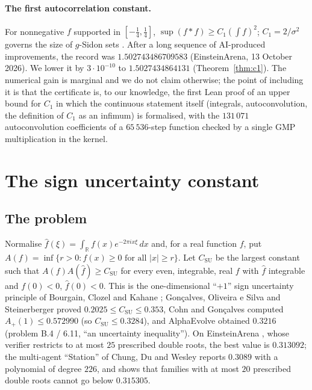 \documentclass[11pt]{article}
\numberwithin{equation}{section}
\theoremstyle{definition}
\theoremstyle{remark}
\begin{document}
\paragraph{The first autocorrelation constant.} For nonnegative $f$ supported in $[-\frac14,\frac14]$,
$\sup(f*f)\ge C_1(\int f)^2$; $C_1=2/\sigma^2$ governs the size of $g$-Sidon sets \cite{CRV10}.
After a long sequence of AI-produced improvements, the record was $1.502743486709583$
(EinsteinArena, 13 October 2026). We lower it by $3\cdot10^{-10}$ to $1.5027434864131$
(Theorem~\ref{thm:c1}). The numerical gain is marginal and we do not claim otherwise; the point of
including it is that the certificate is, to our knowledge, the first Lean proof of an upper bound for
$C_1$ in which the continuous statement itself (integrals, autoconvolution, the definition of $C_1$ as an
infimum) is formalised, with the $131\,071$ autoconvolution coefficients of a $65\,536$-step function
checked by a single GMP multiplication in the kernel.
\section{The sign uncertainty constant}\label{sec:su}

\subsection{The problem}
Normalise $\widehat f(\xi)=\int_{\mathbb R}f(x)e^{-2\pi i x\xi}\,dx$ and, for a real function $f$, put
$A(f)=\inf\{r>0: f(x)\ge0 \text{ for all } |x|\ge r\}$. Let $C_{\mathrm{SU}}$ be the largest constant
such that $A(f)A(\widehat f)\ge C_{\mathrm{SU}}$ for every even, integrable, real $f$ with $\widehat f$
integrable and $f(0)<0$, $\widehat f(0)<0$. This is the one-dimensional ``$+1$'' sign uncertainty
principle of Bourgain, Clozel and Kahane \cite{BCK10}; Gonçalves, Oliveira e Silva and Steinerberger
\cite{GOS17} proved $0.2025\le C_{\mathrm{SU}}\le 0.353$, Cohn and Gonçalves \cite{CG19} computed
$A_+(1)\le 0.572990$ (so $C_{\mathrm{SU}}\le 0.3284$), and AlphaEvolve \cite{AE25,GGTW25} obtained $0.3216$
(problem B.4 / 6.11, ``an uncertainty inequality''). On EinsteinArena \cite{Arena}, whose verifier
restricts to at most $25$ prescribed double roots, the best value is $0.313092$; the multi-agent
``Station'' of Chung, Du and Wesley \cite{CDW26} reports $0.3089$ with a polynomial of degree $226$, and
shows that families with at most $20$ prescribed double roots cannot go below $0.315305$.
\end{document}

